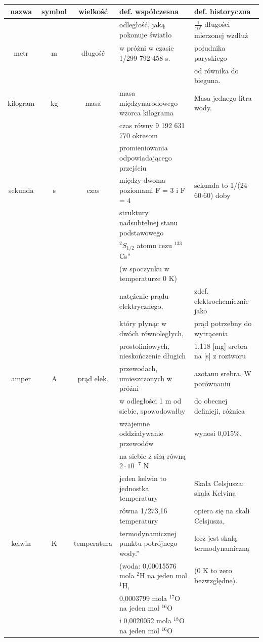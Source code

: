 \documentclass{article}
\begin{document}
\begin{enumerate}
{\small
\begin{tabular}{cccll}
\hline
\hline
nazwa & symbol & wielkość & def. współczesna & def. historyczna \\ 
\hline
\hline
 &&&odległość, jaką pokonuje światło &$\displaystyle\frac{1}{10^7}$ długości mierzonej wzdłuż\\
metr & m & długość &w próżni w czasie 1/299 792 458 s. &  południka paryskiego \\
&&&&od równika do bieguna.\\
\hline
kilogram&	kg&	masa&	masa międzynarodowego wzorca kilograma
&	Masa jednego litra wody.\\
\hline
&&&	czas równy 9 192 631 770 okresom &\\
&&&promieniowania odpowiadającego przejściu \\ 
sekunda&	s&	czas&między dwoma poziomami F = 3 i F = 4&sekunda to 1/(24$\cdot$60$\cdot$60) doby\\
&&& struktury nadsubtelnej stanu podstawowego\\
&&& $^2S_{1/2}$ atomu cezu $^{133}$Cs”\\
 &&&(w spoczynku w temperaturze 0 K)\\
 \hline
	&&& natężenie  prądu elektrycznego,& zdef. elektrochemicznie jako  \\
&&&który płynąc w dwóch równoległych, & prąd potrzebny do wytrącenia\\
&&&prostoliniowych, nieskończenie długich  &  1.118 [mg] srebra na [s] z roztworu\\
amper&	A&	prąd elek.&przewodach,  umieszczonych w próżni& azotanu srebra. W porównaniu\\
&&& w odległości 1 m od siebie, spowodowałby& do obecnej definicji, różnica \\
&&& wzajemne oddziaływanie przewodów&wynosi 0,015\%.\\
&&& na siebie z siłą równą $2\cdot10^{-7}$ N \\
\hline
&&&jeden kelwin to jednostka temperatury&Skala Celsjusza: skala Kelvina \\
&&& równa 1/273,16 temperatury&opiera się na skali Celsjusza,\\
kelwin&	K	&temperatura& termodynamicznej punktu potrójnego wody.”&lecz jest skalą termodynamiczną\\
&&& (woda: 0,00015576 mola $^2$H na jeden mol $^1$H,& (0 K to zero bezwzględne).\\
&&& 0,0003799 mola $^{17}$O na jeden mol $^{16}$O\\
&&& i 0,0020052 mola ${^18}$O na jeden mol $^{16}$O\\

\end{tabular}}
\end{enumerate}
\end{document}
